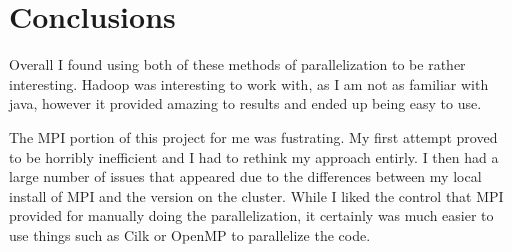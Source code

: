 \documentclass[12pt]{article}
\begin{document}
\section*{Conclusions}\label{conclusions}
Overall I found using both of these methods of parallelization to be rather interesting.
Hadoop was interesting to work with, as I am not as familiar with java, however it provided
amazing to results and ended up being easy to use.

The MPI portion of this project for me was fustrating. My first attempt proved to be horribly inefficient
and I had to rethink my approach entirly. I then had a large number of issues that appeared due to the
differences between my local install of MPI and the version on the cluster. While I liked the control
that MPI provided for manually doing the parallelization, it certainly was much easier to use things
such as Cilk or OpenMP to parallelize the code.
\end{document}
